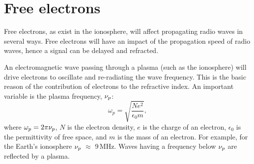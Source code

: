 


\section{Free electrons}
 \label{sec:rindex:freee}
%
Free electrons, as exist in the ionosphere, will affect propagating radio waves
in several ways. Free electrons will have an impact of the propagation speed of
radio waves, hence a signal can be delayed and refracted. 

An electromagnetic wave passing through a plasma (such as the ionosphere) will
drive electrons to oscillate and re-radiating the wave frequency. This is the
basic reason of the contribution of electrons to the refractive index. 
An important variable is the plasma frequency, $\nu_{p}$:
\begin{equation}
  \omega_{p}=\sqrt{\frac{Ne^{2}}{\epsilon_{0}m}},
\end{equation}
where \(\omega_{p}=2\pi\nu_{p}\), \(N\) is the electron density, \(e\) is the
charge of an electron, \(\epsilon_{0}\) is the permittivity of free space, and
\(m\) is the mass of an electron. For example, for the Earth's ionosphere
\(\nu_{p}\) \(\approx\) 9\,MHz.
Waves having a frequency below $\nu_{p}$ are reflected by a plasma.


